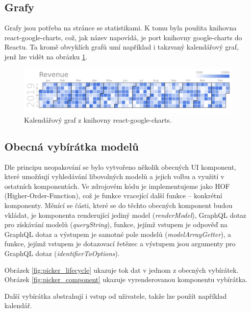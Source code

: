 \subsection{Grafy} \label{graphs}

\noindent
Grafy jsou potřeba na stránce se statistikami. K tomu byla použita knihovna react-google-charts,
což, jak název napovídá, je port knihovny google-charts do Reactu. Ta kromě obvyklích grafů umí
například i takzvaný kalendářový graf, jenž lze vidět na obrázku \ref{fig:google_charts}.

\begin{figure}[!htb] \centering
  \includegraphics[width=145mm]{../img/google_charts.png}
  \caption{Kalendářový graf z knihovny react-google-charts.}
  \label{fig:google_charts}
\end{figure}

\subsection{Obecná vybírátka modelů}

\noindent
Dle principu neopakování se bylo vytvořeno několik obecných UI komponent, které umožňují vyhledávání libovolných
modelů a jejich volbu a využití v ostatních komponentách. Ve zdrojovém kódu je implementujeme jako
HOF (Higher-Order-Function), což je funkce vracející další funkce -- konkrétní komponenty.
Měnící se části, které se do těchto obecných komponent budou vkládat, je komponenta renderující jediný model
(\textit{renderModel}),
GraphQL dotaz pro získávání modelů (\textit{queryString}), funkce, jejímž vstupem je odpověď na GraphQL dotaz a výstupem je
samotné pole modelů (\textit{modelArrayGetter}), a funkce, jejímž vstupem je dotazovací řetězec a výstupem jsou
argumenty pro GraphQL dotaz (\textit{identifierToOptions}).

Obrázek \ref{fig:picker_lifecycle} ukazuje tok dat v jednom z obecných vybírátek.
Obrázek \ref{fig:picker_component} ukazuje vyrenderovanou komponentu vybírátka.

Další vybírátka abstrahují i vstup od uživatele, takže lze použít například kalendář.


